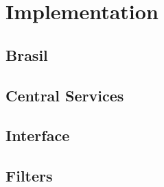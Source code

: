\section{Implementation}

\subsection{Brasil}

\subsection{Central Services}

\subsection{Interface}

\subsection{Filters}

